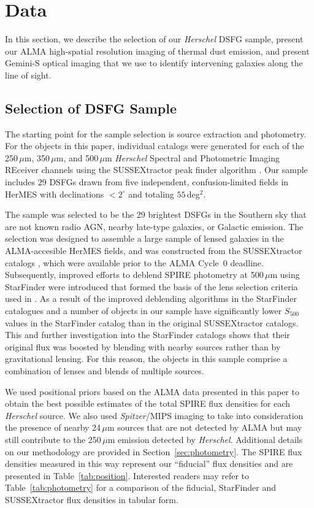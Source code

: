 \documentclass[iop]{emulateapj}
\begin{document}
\section{Data}\label{sec:obs}

In this section, we describe the selection of our {\it Herschel} DSFG sample,
present our ALMA high-spatial resolution imaging of thermal dust emission, and
present Gemini-S optical imaging that we use to identify intervening galaxies
along the line of sight.  

\subsection{Selection of DSFG Sample}\label{sec:select}

The starting point for the sample selection is source extraction and
photometry.  For the objects in this paper, individual catalogs were generated
for each of the 250$\, \mu$m, 350$\,\mu$m, and 500$\,\mu$m {\it Herschel}
Spectral and Photometric Imaging REceiver \citep[SPIRE;][]{2010A&A...518L...3G}
channels using the SUSSEXtractor peak finder algorithm \citep{Savage:2007sf}.
Our sample includes 29 DSFGs drawn from five independent, confusion-limited
fields in HerMES with declinations $< 2 ^\circ$ and totaling $55\,$deg$^2$.

The sample was selected to be the 29 brightest DSFGs in the Southern sky that
are not known radio AGN, nearby late-type galaxies, or Galactic emission. The
selection was designed to assemble a large sample of lensed galaxies in the
ALMA-accesible HerMES fields, and was constructed from the SUSSEXtractor
catalogs \citep{Smith:2012uq}, which were available prior to the ALMA Cycle~0
deadline.  Subsequently, improved efforts to deblend SPIRE photometry at
500$\,\mu$m using StarFinder \citep{Wang:2014lr} were introduced that formed
the basis of the lens selection criteria used in \citet{Wardlow:2013lr}.  As a
result of the improved deblending algorithms in the StarFinder catalogues and
\citet{Wardlow:2013lr} a number of objects in our sample have significantly
lower $S_{500}$ values in the StarFinder catalog than in the original
SUSSEXtractor catalogs.  This and further investigation into the StarFinder
catalogs shows that their original flux was boosted by blending with nearby
sources rather than by gravitational lensing.  For this reason, the objects in
this sample comprise a combination of lenses and blends of multiple sources.

We used positional priors based on the ALMA data presented in this paper to
obtain the best possible estimates of the total SPIRE flux densities for each
{\it Herschel} source.  We also used {\it Spitzer}/MIPS
\citep{2004ApJS..154...25R} imaging to take into consideration the presence of
nearby 24$\,\mu$m sources that are not detected by ALMA but may still
contribute to the 250$\,\mu$m emission detected by {\it Herschel}.  Additional
details on our methodology are provided in Section~\ref{sec:photometry}.  The
SPIRE flux densities measured in this way represent our ``fiducial'' flux
densities and are presented in Table~\ref{tab:position}.  Interested readers
may refer to Table~\ref{tab:photometry} for a comparison of the fiducial,
StarFinder and SUSSEXtractor flux densities in tabular form. 
\end{document}
